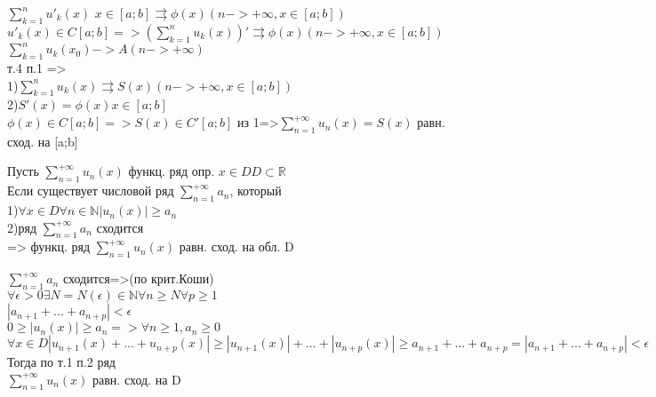 \begin{Proof}
  $\sum \limits_{k=1}^{n} u'_k(x)$ $x\in [a;b]\rightrightarrows \phi(x)  (n->+\infty,x\in [a;b])$\\
  $u'_k(x)\in C[a;b] =>(\sum \limits_{k=1}^{n} u_k(x))' \rightrightarrows \phi(x)  (n->+\infty,x\in [a;b])$\\
  $\sum \limits_{k=1}^{n} u_k(x_0)->A (n->+\infty)$\\
  т.4 п.1 =>\\
  1)$\sum \limits_{k=1}^{n} u_k(x)\rightrightarrows S(x)  (n->+\infty,x\in [a;b])$\\
  2)$S'(x)=\phi(x) x \in [a;b]$\\
  $\phi(x)\in C[a;b]=>S(x)\in C'[a;b]$
  из 1=>$\sum \limits_{n=1}^{+ \infty} u_n(x)=S(x)$ равн. сход. на [a;b]\\
\end{Proof}

\begin{Th}
  Пусть $\sum \limits_{n=1}^{+ \infty} u_n(x)$ функц. ряд опр. $x\in D D\subset \mathbb{R}$\\
  Если существует числовой ряд $\sum \limits_{n=1}^{+ \infty} a_n$, который\\
  1)$\forall x \in D \forall n \in \mathbb{N} |u_n(x)|\geqslant a_n$\\
  2)ряд $\sum \limits_{n=1}^{+ \infty} a_n$ сходится\\
  => функц. ряд $\sum \limits_{n=1}^{+ \infty} u_n(x)$ равн. сход. на обл. D\\
\end{Th}

\begin{Proof}
  $\sum \limits_{n=1}^{+ \infty} a_n$ сходится=>(по крит.Коши) \\
  $\forall \epsilon >0 \exists N=N(\epsilon) \in \mathbb{N}  \forall n\geqslant N \forall p\geqslant 1$\\
  $|a_{n+1}+...+a_{n+p}|<\epsilon$\\
  $0\geqslant |u_n(x)|\geqslant a_n => \forall n \geqslant 1, a_n \geqslant 0$\\
  $\forall x \in D |u_{n+1}(x)+...+u_{n+p}(x)|\geqslant |u_{n+1}(x)|+...+|u_{n+p}(x)|\geqslant a_{n+1}+...+a_{n+p}=|a_{n+1}+...+a_{n+p}|<\epsilon$\\
  Тогда по т.1 п.2 ряд\\
  $\sum \limits_{n=1}^{+ \infty} u_n(x)$ равн. сход. на D\\
\end{Proof}